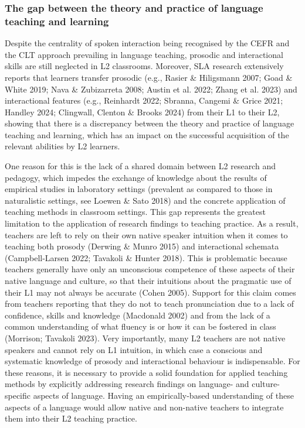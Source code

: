 \subsubsection[The gap between the theory and practice of language teaching and learning]{The gap between the theory and practice of language teaching and learning}
\hypertarget{Toc191305876}{}\begin{styleStandard}
Despite the centrality of spoken interaction being recognised by the CEFR and the CLT approach prevailing in language teaching, prosodic and interactional skills are still neglected in L2 classrooms. Moreover, SLA research extensively reports that learners transfer prosodic (e.g., Rasier \& Hiligsmann 2007; Goad \& White 2019; Nava \& Zubizarreta 2008; Austin et al. 2022; Zhang et al. 2023) and interactional features (e.g., Reinhardt 2022; Sbranna, Cangemi \& Grice 2021; Handley 2024; Clingwall, Clenton \& Brooks 2024) from their L1 to their L2, showing that there is a discrepancy between the theory and practice of language teaching and learning, which has an impact on the successful acquisition of the relevant abilities by L2 learners. 
\end{styleStandard}

\begin{styleStandard}
One reason for this is the lack of a shared domain between L2 research and pedagogy, which impedes the exchange of knowledge about the results of empirical studies in laboratory settings (prevalent as compared to those in naturalistic settings, see Loewen \& Sato 2018) and the concrete application of teaching methods in classroom settings. This gap represents the greatest limitation to the application of research findings to teaching practice. As a result, teachers are left to rely on their own native speaker intuition when it comes to teaching both prosody (Derwing \& Munro 2015) and interactional schemata (Campbell-Larsen 2022; Tavakoli \& Hunter 2018). This is problematic because teachers generally have only an unconscious competence of these aspects of their native language and culture, so that their intuitions about the pragmatic use of their L1 may not always be accurate (Cohen 2005). Support for this claim comes from teachers reporting that they do not to teach pronunciation due to a lack of confidence, skills and knowledge (Macdonald 2002) and from the lack of a common understanding of what fluency is or how it can be fostered in class (Morrison; Tavakoli 2023). Very importantly, many L2 teachers are not native speakers and cannot rely on L1 intuition, in which case a conscious and systematic knowledge of prosody and interactional behaviour is indispensable. For these reasons, it is necessary to provide a solid foundation for applied teaching methods by explicitly addressing research findings on language- and culture-specific aspects of language. Having an empirically-based understanding of these aspects of a language would allow native and non-native teachers to integrate them into their L2 teaching practice.
\end{styleStandard}

